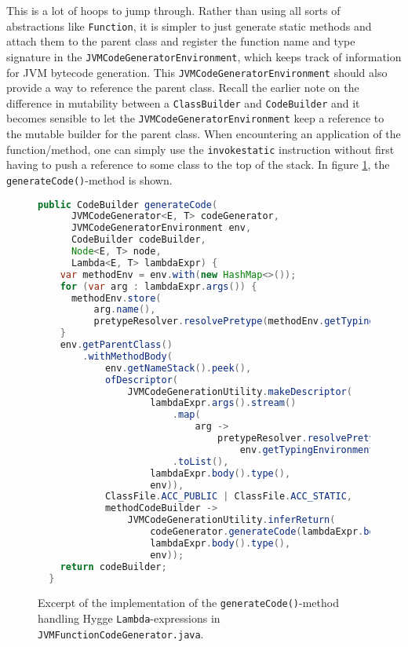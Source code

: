 This is a lot of hoops to jump through. Rather than using all sorts of abstractions like \texttt{Function}, it is simpler to just generate static
methods and attach them to the parent class and register the function name and type signature in the \texttt{JVMCodeGeneratorEnvironment}, which
keeps track of information for JVM bytecode generation. This \texttt{JVMCodeGeneratorEnvironment} should also provide a way to reference the
parent class. Recall the earlier note on the difference in mutability between a \texttt{ClassBuilder} and \texttt{CodeBuilder} and it becomes
sensible to let the \texttt{JVMCodeGeneratorEnvironment} keep a reference to the mutable builder for the parent class. When encountering
an application of the function/method, one can simply use the \texttt{invokestatic} instruction without first having to push a reference
to some class to the top of the stack. In figure \ref{fig:jvm_function_builder}, the \texttt{generateCode()}-method is shown.

\begin{figure}[H]
 \centering 
 \begin{lstlisting}[language=Java]
  public CodeBuilder generateCode(
      JVMCodeGenerator<E, T> codeGenerator,
      JVMCodeGeneratorEnvironment env,
      CodeBuilder codeBuilder,
      Node<E, T> node,
      Lambda<E, T> lambdaExpr) {
    var methodEnv = env.with(new HashMap<>());
    for (var arg : lambdaExpr.args()) {
      methodEnv.store(
          arg.name(),
          pretypeResolver.resolvePretype(methodEnv.getTypingEnvironment(), arg.preType()));
    }
    env.getParentClass()
        .withMethodBody(
            env.getNameStack().peek(),
            ofDescriptor(
                JVMCodeGenerationUtility.makeDescriptor(
                    lambdaExpr.args().stream()
                        .map(
                            arg ->
                                pretypeResolver.resolvePretype(
                                    env.getTypingEnvironment(), arg.preType()))
                        .toList(),
                    lambdaExpr.body().type(),
                    env)),
            ClassFile.ACC_PUBLIC | ClassFile.ACC_STATIC,
            methodCodeBuilder ->
                JVMCodeGenerationUtility.inferReturn(
                    codeGenerator.generateCode(lambdaExpr.body(), methodEnv, methodCodeBuilder),
                    lambdaExpr.body().type(),
                    env));
    return codeBuilder;
  }
 \end{lstlisting}
 \caption{Excerpt of the implementation of the \texttt{generateCode()}-method handling Hygge \texttt{Lambda}-expressions in \texttt{JVMFunctionCodeGenerator.java}.}
 \label{fig:jvm_function_builder}
\end{figure}

